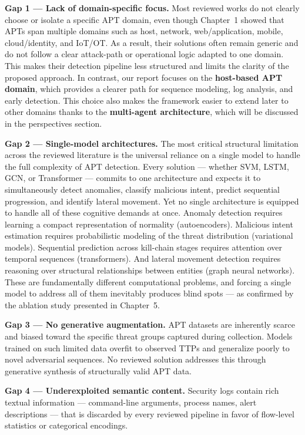 \textbf{Gap 1 --- Lack of domain-specific focus.}
Most reviewed works do not clearly choose or isolate a specific APT domain, even though Chapter~1 showed that APTs span multiple domains such as host, network, web/application, mobile, cloud/identity, and IoT/OT. As a result, their solutions often remain generic and do not follow a clear attack-path or operational logic adapted to one domain. This makes their detection pipeline less structured and limits the clarity of the proposed approach. In contrast, our report focuses on the \textbf{host-based APT domain}, which provides a clearer path for sequence modeling, log analysis, and early detection. This choice also makes the framework easier to extend later to other domains thanks to the \textbf{multi-agent architecture}, which will be discussed in the perspectives section.

\textbf{Gap 2 --- Single-model architectures.}
The most critical structural limitation across the reviewed literature is the universal reliance on a single model to handle the full complexity of APT detection. Every solution — whether SVM, LSTM, GCN, or Transformer --- commits to one architecture and expects it to simultaneously detect anomalies, classify malicious intent, predict sequential progression, and identify lateral movement. Yet no single architecture is equipped to handle all of these cognitive demands at once. Anomaly detection requires learning a compact representation of normality (autoencoders). Malicious intent estimation requires probabilistic modeling of the threat distribution (variational models). Sequential prediction across kill-chain stages requires attention over temporal sequences (transformers). And lateral movement detection requires reasoning over structural relationships between entities (graph neural networks). These are fundamentally different computational problems, and forcing a single model to address all of them inevitably produces blind spots --- as confirmed by the ablation study presented in Chapter~5.

\textbf{Gap 3 --- No generative augmentation.}
APT datasets are inherently scarce and biased toward the specific threat groups captured during collection. Models trained on such limited data overfit to observed TTPs and generalize poorly to novel adversarial sequences. No reviewed solution addresses this through generative synthesis of structurally valid APT data.

\textbf{Gap 4 --- Underexploited semantic content.}
Security logs contain rich textual information --- command-line arguments, process names, alert descriptions --- that is discarded by every reviewed pipeline in favor of flow-level statistics or categorical encodings.

